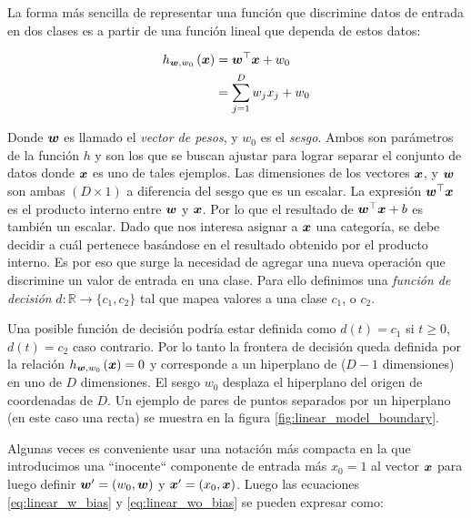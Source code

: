 La forma más sencilla de representar una función que discrimine datos de entrada
en dos clases es a partir de una función lineal que dependa de estos datos:

\begin{align}
    h_{\boldsymbol{w}, w_0}\left( \boldsymbol{x} \right) &= \boldsymbol{w}^{\top} \boldsymbol{x} + w_0  \label{eq:linear_w_bias}\\
                                           &= \sum_{j = 1 }^{D} w_j x_j + w_0 \label{eq:linear_wo_bias}
\end{align}

Donde $\boldsymbol{w}$ es llamado el \emph{vector de pesos}, y $w_0$ es el
\emph{sesgo}. Ambos son parámetros de la función $h$ y son los que se buscan
ajustar para lograr separar el conjunto de datos donde $\boldsymbol{x}$ es uno de
tales ejemplos. Las dimensiones de los vectores $\boldsymbol{x}$, y $\boldsymbol{w}$ son
ambas $(D \times 1)$ a diferencia del sesgo que es un escalar. La expresión
$\boldsymbol{w}^{\top} \boldsymbol{x}$ es el producto interno entre $\boldsymbol{w}$ y $\boldsymbol{x}$.
Por lo que el resultado de $\boldsymbol{w}^{\top} \boldsymbol{x} + b$ es también un escalar.
Dado que nos interesa asignar a $\boldsymbol{x}$ una categoría, se debe decidir a cuál
pertenece basándose en el resultado obtenido por el producto interno. Es por eso que
surge la necesidad de agregar una nueva operación que discrimine un valor de
entrada en una clase. Para ello definimos una \emph{función de decisión} $d:
\mathbb{R} \rightarrow \{c_1, c_2\}$ tal que mapea valores a una clase $c_1$, o
$c_2$.

Una posible función de decisión podría estar definida como $d(t) = c_1$ si $t
\geq 0$, $d(t) = c_2$ caso contrario. Por lo tanto la frontera de decisión queda
definida por la relación $h_{\boldsymbol{w}, w_0}\left( \boldsymbol{x} \right) = 0$ y
corresponde a un hiperplano de ($D-1$ dimensiones) en uno de $D$ dimensiones. El
sesgo $w_0$ desplaza el hiperplano del origen de coordenadas de $D$. Un ejemplo de
pares de puntos separados por un hiperplano (en este caso una recta) se muestra
en la figura \ref{fig:linear_model_boundary}.

Algunas veces es conveniente usar una notación más compacta en la que
introducimos una ``inocente`` componente de entrada más $x_0 = 1$ al vector
$\boldsymbol{x}$ para luego definir $\boldsymbol{w}' = (w_0, \boldsymbol{w})$ y $\boldsymbol{x}' = (x_0,
\boldsymbol{x})$. Luego las ecuaciones \ref{eq:linear_w_bias} y
\ref{eq:linear_wo_bias} se pueden expresar como:

